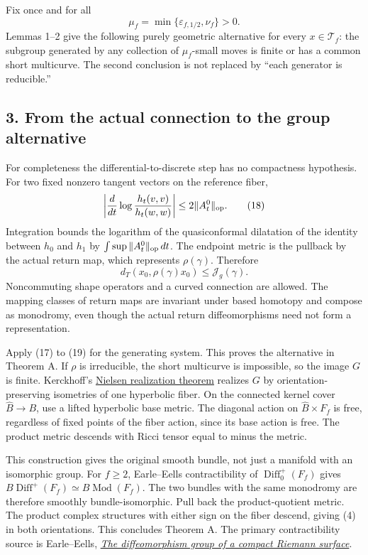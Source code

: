 \documentclass[
  11pt,
]{article}
\begin{document}
Fix once and for all \[
                \mu_f=\min\{\varepsilon_{f,1/2},\nu_f\}>0.   \tag{17}
\] Lemmas 1--2 give the following purely geometric alternative for every
\(x\in\mathcal T_f\): the subgroup generated by any collection of
\(\mu_f\)-small moves is finite or has a common short multicurve. The
second conclusion is not replaced by ``each generator is reducible.''

\hypertarget{from-the-actual-connection-to-the-group-alternative}{%
\subsection{3. From the actual connection to the group
alternative}\label{from-the-actual-connection-to-the-group-alternative}}

For completeness the differential-to-discrete step has no compactness
hypothesis. For two fixed nonzero tangent vectors on the reference
fiber, \[
 \left|\frac d{dt}\log\frac{h_t(v,v)}{h_t(w,w)}\right|
                      \le2\|A_t^0\|_{\rm op}.                \tag{18}
\] Integration bounds the logarithm of the quasiconformal dilatation of
the identity between \(h_0\) and \(h_1\) by
\(\int\sup\|A_t^0\|_{\rm op}\,dt\). The endpoint metric is the pullback
by the actual return map, which represents \(\rho(\gamma)\). Therefore
\[
                 d_T(x_0,\rho(\gamma)x_0)
                                   \le\mathcal J_g(\gamma).  \tag{19}
\] Noncommuting shape operators and a curved connection are allowed. The
mapping classes of return maps are invariant under based homotopy and
compose as monodromy, even though the actual return diffeomorphisms need
not form a representation.

Apply (17) to (19) for the generating system. This proves the
alternative in Theorem A. If \(\rho\) is irreducible, the short
multicurve is impossible, so the image \(G\) is finite. Kerckhoff's
\href{https://annals.math.princeton.edu/1983/117-2/p02}{Nielsen
realization theorem} realizes \(G\) by orientation-preserving isometries
of one hyperbolic fiber. On the connected kernel cover
\(\widehat B\to B\), use a lifted hyperbolic base metric. The diagonal
action on \(\widehat B\times F_f\) is free, regardless of fixed points
of the fiber action, since its base action is free. The product metric
descends with Ricci tensor equal to minus the metric.

This construction gives the original smooth bundle, not just a manifold
with an isomorphic group. For \(f\ge2\), Earle--Eells contractibility of
\(\operatorname{Diff}_0^+(F_f)\) gives
\(B\operatorname{Diff}^+(F_f)\simeq B\operatorname{Mod}(F_f)\). The two
bundles with the same monodromy are therefore smoothly
bundle-isomorphic. Pull back the product-quotient metric. The product
complex structures with either sign on the fiber descend, giving (4) in
both orientations. This concludes Theorem A. The primary contractibility
source is Earle--Eells,
\href{https://doi.org/10.1090/S0002-9904-1967-11746-4}{\emph{The
diffeomorphism group of a compact Riemann surface}}.
\end{document}
